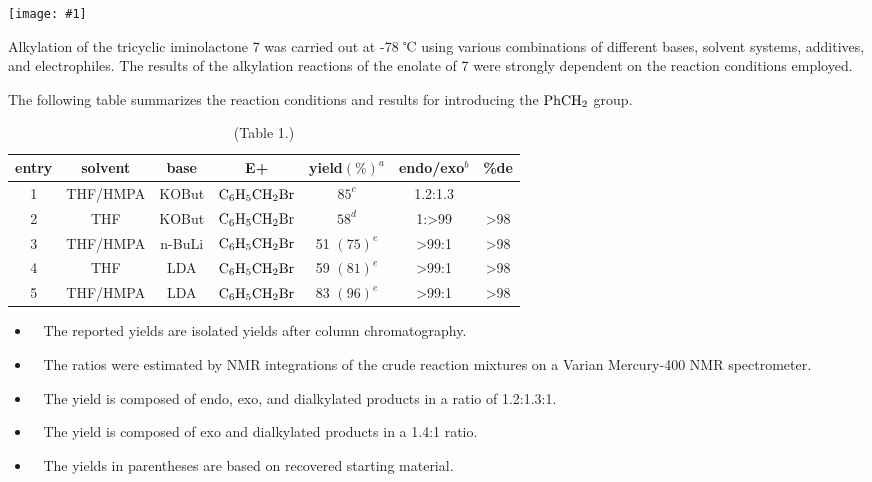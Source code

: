 \documentclass[a4paper,papersize,dvipdfmx]{jsarticle}
\newcommand{\pict}[2]{\begin{center} \texttt{[image: \#1]} \end{center}}   %
\newcommand{\mon}[1]{\item[({#1})] \ }
\begin{document}
\pict{imgs-k/hk2.jpeg}{10}

Alkylation of the tricyclic iminolactone 7 was carried out at -78 ℃ using various combinations of different bases, solvent systems, additives, and electrophiles. The results of the alkylation reactions of the enolate of 7 were strongly dependent on the reaction conditions employed. 

The following table summarizes the reaction conditions and results for introducing the $\rm PhCH_2$ group.

\begin{table}[H]
\begin{center}
\begin{tabular}{|c|c|c|c|c|c|c|}
\hline
entry & solvent  & base   & E+        & yield$(\%)^a$ & endo/exo$^b$          & \%de            \\ \hline
1     & THF/HMPA & KOBut  &  $\rm C_6H_5CH_2Br$  & $85^c$        & 1.2:1.3            &             \\ \hline
2     & THF      & KOBut  & $\rm C_6H_5CH_2Br$ & $58^d$        & 1:\textgreater{}99 & \textgreater{}98 \\ \hline
3     & THF/HMPA & n-BuLi & $\rm C_6H_5CH_2Br$ & 51 $(75)^e$   & \textgreater{}99:1 & \textgreater{}98 \\ \hline
4     & THF      & LDA    & $\rm C_6H_5CH_2Br$ & 59 $(81)^e$   & \textgreater{}99:1 & \textgreater{}98 \\ \hline
5     & THF/HMPA & LDA    & $\rm C_6H_5CH_2Br$ & 83 $(96)^e$   & \textgreater{}99:1 & \textgreater{}98 \\ \hline
\end{tabular}
\end{center}
\caption{(Table 1.)}
\end{table}

\footnotesize{
\begin{itemize}
\mon{a} The reported yields are isolated yields after column chromatography. 

\mon{b} The ratios were estimated by NMR integrations of the crude reaction mixtures on a Varian Mercury-400 NMR spectrometer.

\mon{c} The yield is composed of endo, exo, and dialkylated products in a ratio of 1.2:1.3:1. 

\mon{d} The yield is composed of exo and dialkylated products in a 1.4:1 ratio. 

\mon{e} The yields in parentheses are based on recovered starting material.
\end{itemize}}
\end{document}
